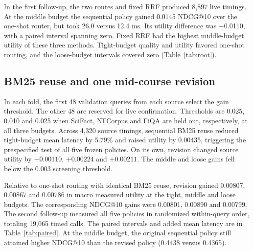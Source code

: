 \documentclass{article}
\newcommand{\datatable}[1]{\begingroup\setlength{\tabcolsep}{4pt}\endgroup}
\newcommand{\widetable}[1]{\begingroup\setlength{\tabcolsep}{2.6pt}\endgroup}
\begin{document}
In the first follow-up, the two routes and fixed RRF produced 8,897 live timings. At the middle budget the sequential policy gained 0.0145 NDCG@10 over the one-shot router, but took 26.0 versus 12.4 ms. Its utility difference was $-$0.0110, with a paired interval spanning zero. Fixed RRF had the highest middle-budget utility of these three methods. Tight-budget quality and utility favored one-shot routing, and the loose-budget intervals covered zero (Table~\ref{tab:root}).

\begin{table}[htbp]\centering
\caption{First routing follow-up. Each difference subtracts the one-shot ridge router from the sequential policy. Intervals use 2,000 paired query resamples within each fixed domain.}
\label{tab:root}\datatable{root}
\end{table}

\subsection{BM25 reuse and one mid-course revision}
In each fold, the first 48 validation queries from each source select the gain threshold. The other 48 are reserved for live confirmation. Thresholds are 0.025, 0.010 and 0.025 when SciFact, NFCorpus and FiQA are held out, respectively, at all three budgets. Across 4,320 source timings, sequential BM25 reuse reduced tight-budget mean latency by 5.79\% and raised utility by 0.00435, triggering the prespecified test of all five frozen policies. On its own, revision changed source utility by $-0.00110$, $+0.00224$ and $+0.00211$. The middle and loose gains fell below the 0.003 screening threshold.

\begin{table}[htbp]\centering
\caption{Second routing follow-up on the three held-out domains. Each of the 1,271 queries is measured once per method and budget. $N$ is NDCG@10, $U$ is measured utility and ms is mean end-to-end latency. RRF was timed in the earlier sessions.}
\label{tab:routing}\widetable{routing}
\end{table}

Relative to one-shot routing with identical BM25 reuse, revision gained 0.00807, 0.00867 and 0.00786 in macro measured utility at the tight, middle and loose budgets. The corresponding NDCG@10 gains were 0.00801, 0.00890 and 0.00799. The second follow-up measured all five policies in randomized within-query order, totaling 19,065 timed calls. The paired intervals and added mean latency are in Table~\ref{tab:paired}. At the middle budget, the original sequential policy still attained higher NDCG@10 than the revised policy (0.4438 versus 0.4365).
\end{document}
